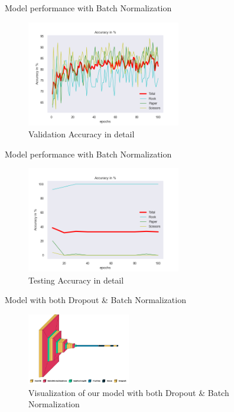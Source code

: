 \documentclass[aspectratio=169]{beamer}
\begin{document}
{    \begin{frame}{Model performance with Batch Normalization}
        \begin{figure}
            \centering
            \includegraphics[width=0.6\textwidth]{img/baptiste_100epoches_accuracy__Dropouts_False__BatchNorm_True.png}
            \caption{Validation Accuracy in detail}
        \end{figure}
    \end{frame}

    \begin{frame}{Model performance with Batch Normalization}
        \begin{figure}
            \centering
            \includegraphics[width=0.6\textwidth]{img/baptiste_100_epoches_test_accuracy__Dropouts_False__BatchNorm_True.png}
            \caption{Testing Accuracy in detail}
        \end{figure}
    \end{frame}


    \begin{frame}{Model with both Dropout \& Batch Normalization}
        \begin{figure}
            \centering
            \includegraphics[width=0.4\textwidth]{img/model_dropout_true_batchnorm_true.png}
            \caption{Visualization of our model with both Dropout \& Batch Normalization}
        \end{figure}
    \end{frame}

}
\end{document}
